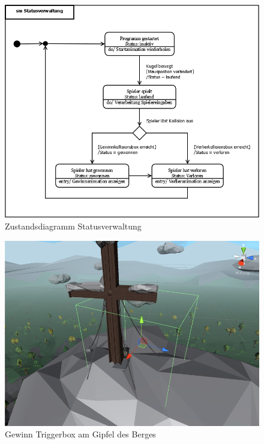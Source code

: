 \begin{figure}[H]
\centering
\caption{Zustandsdiagramm Statusverwaltung}
\label{Abb:SMStatus}
\includegraphics[scale=0.425]{Bilder/Diagramme/smStatusverwaltung.png}
\end{figure}

\begin{figure}[H]
\centering
\caption{Gewinn Triggerbox am Gipfel des Berges}
\label{Abb:GewinnTrigger}
\includegraphics[scale=0.55]{Bilder/GewinnTrigger.png}
\end{figure}

